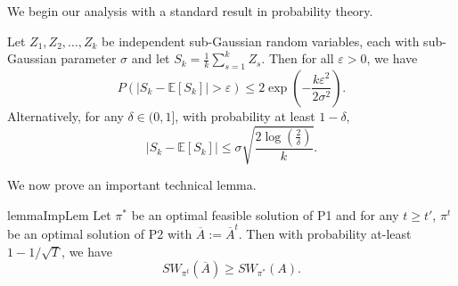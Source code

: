 We  begin our analysis with a standard result in probability theory. 
\iffalse
\begin{lemma}[Hoeffding's Inequality~\tocite ]
Let $X_1, X_2, \cdots, X_n$ be independent bounded
random variables with $X_i  \in  [a, b]$  for all $i$, where $ - \infty <  a  \leq  b  <  \infty $. Then
\begin{equation}
    \mathbb{P}\Big( \frac{1}{n} \sum_{i=1}^n ( X_i - \mathbb{E}(X_i) ) \geq \varepsilon \Big ) \leq   \exp^{- \frac{2 n \varepsilon^2}{(b-a)^2} } \ \ \ \text{ for all }  \varepsilon > 0.
    \end{equation}
    Similarly, 
    \begin{equation}
    \mathbb{P}\Big( \frac{1}{n} \sum_{i=1}^n ( X_i - \mathbb{E}(X_i) ) \leq   - \varepsilon \Big) \leq   \exp^{- \frac{2 n \varepsilon^2}{(b-a)^2} } \ \ \ \text{ for all }  \varepsilon > 0.
    \end{equation}
\end{lemma}
\fi
\begin{lemma}\label{lem:hoeffding}
   Let \( Z_1, Z_2, \dots, Z_k \) be independent sub-Gaussian random variables, each with sub-Gaussian parameter \( \sigma \) and let $S_k = \frac{1}{k} \sum_{s=1}^k Z_s$.  Then  for all \( \varepsilon > 0 \), we have 
\[
P\left( \left| S_k - \mathbb{E}[S_k] \right| > \varepsilon \right) \leq 2 \exp \left( - \frac{ k \varepsilon^2}{2  \sigma^2} \right).
\]
Alternatively, for any \( \delta \in (0, 1] \), with probability at least \( 1 - \delta \),
\[
\left| S_k - \mathbb{E}[S_k] \right| \leq \sigma \sqrt{\frac{2 \log\left( \frac{2}{\delta} \right)}{k}}. 
\]
 
\end{lemma}

\noindent We now prove an important technical lemma. 


\begin{restatable}{lemma}{ImpLem} Let $\pi^*$ be an optimal feasible solution of P1 and for any $t \geq t'$,   $\pi^t$ be an optimal solution of  P2 with $\overline{A}:= \overline{A}^t$. Then with probability at-least $1-  1/\sqrt{T}$, we have  \[  SW_{\pi^t} (\overline{A}) \geq SW_{\pi^*}( A ).  \]
\label{lem:equivalence}
\end{restatable}


